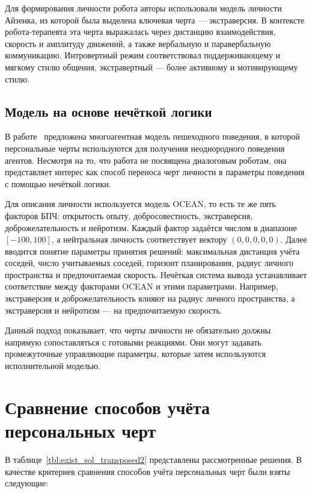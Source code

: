 Для формирования личности робота авторы использовали модель личности Айзенка, из которой была выделена ключевая черта --- экстраверсия.
В контексте робота-терапевта эта черта выражалась через дистанцию взаимодействия, скорость и амплитуду движений, а также вербальную и паравербальную коммуникацию.
Интровертный режим соответствовал поддерживающему и мягкому стилю общения, экстравертный --- более активному и мотивирующему стилю.

\subsection{Модель на основе нечёткой логики}

В работе~\cite{xue2017fuzzy} предложена многоагентная модель пешеходного поведения, в которой персональные черты используются для получения неоднородного поведения агентов.
Несмотря на то, что работа не посвящена диалоговым роботам, она представляет интерес как способ переноса черт личности в параметры поведения с помощью нечёткой логики.

Для описания личности используется модель OCEAN, то есть те же пять факторов БПЧ: открытость опыту, добросовестность, экстраверсия, доброжелательность и нейротизм.
Каждый фактор задаётся числом в диапазоне $[-100, 100]$, а нейтральная личность соответствует вектору $(0, 0, 0, 0, 0)$.
Далее вводится понятие параметры принятия решений: максимальная дистанция учёта соседей, число учитываемых соседей, горизонт планирования, радиус личного пространства и предпочитаемая скорость.
Нечёткая система вывода устанавливает соответствие между факторами OCEAN и этими параметрами.
Например, экстраверсия и доброжелательность влияют на радиус личного пространства, а экстраверсия и нейротизм --- на предпочитаемую скорость.

Данный подход показывает, что черты личности не обязательно должны напрямую сопоставляться с готовыми реакциями.
Они могут задавать промежуточные управляющие параметры, которые затем используются исполнительной моделью.

\clearpage

\section{Сравнение способов учёта персональных черт}

В таблице~\ref{tbl:exist_sol_transposed2} представлены рассмотренные решения.
В качестве критериев сравнения способов учёта персональных черт были взяты следующие:

